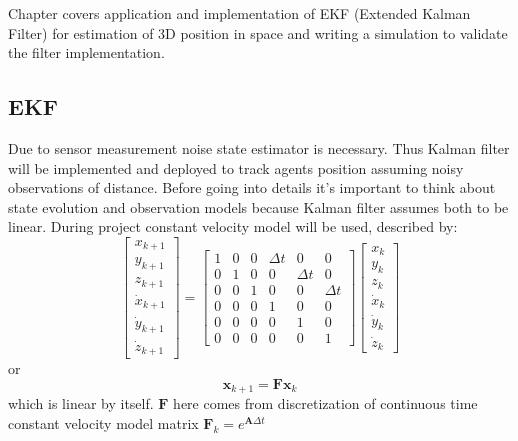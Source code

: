 Chapter covers application and implementation of EKF (Extended Kalman Filter) for estimation of 3D position in space and writing a simulation to validate the filter implementation.

\subsection{EKF}

Due to sensor measurement noise state estimator is necessary. Thus Kalman filter will be implemented and deployed to track agents position assuming noisy observations of distance. Before going into details it's important to think about state evolution and observation models because Kalman filter assumes both to be linear. During project constant velocity model will be used, described by:
$$
    \left[\begin{array}{c}
            x_{k+1}       \\
            y_{k+1}       \\
            z_{k+1}       \\
            \dot{x}_{k+1} \\
            \dot{y}_{k+1} \\
            \dot{z}_{k+1}
        \end{array}\right]=\left[\begin{array}{cccccc}
            1 & 0 & 0 & \Delta t & 0        & 0        \\
            0 & 1 & 0 & 0        & \Delta t & 0        \\
            0 & 0 & 1 & 0        & 0        & \Delta t \\
            0 & 0 & 0 & 1        & 0        & 0        \\
            0 & 0 & 0 & 0        & 1        & 0        \\
            0 & 0 & 0 & 0        & 0        & 1
        \end{array}\right]\left[\begin{array}{c}
            x_{k}       \\
            y_{k}       \\
            z_{k}       \\
            \dot{x}_{k} \\
            \dot{y}_{k} \\
            \dot{z}_{k}
        \end{array}\right]
$$
or
$$
    \boldsymbol{x}_{k+1} = \boldsymbol{F} \boldsymbol{x}_k
$$
which is linear by itself. $\boldsymbol{F}$ here comes from discretization of continuous time constant velocity model matrix $\mathbf{F}_k=e^{\mathbf{A} \Delta t}$

